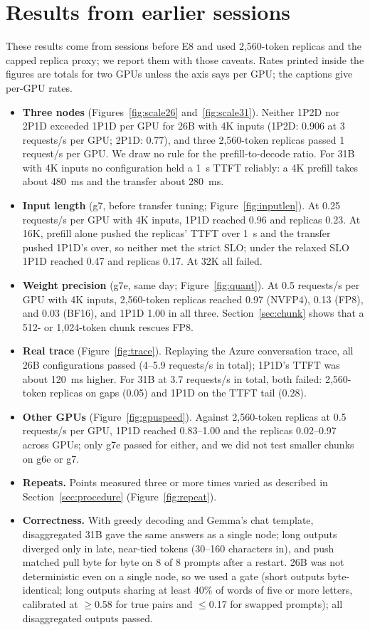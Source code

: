 \documentclass[11pt]{article}
\begin{document}
\section{Results from earlier sessions}\label{app:other}
These results come from sessions before E8 and used 2,560-token replicas and the capped replica proxy; we report them with those caveats. Rates printed inside the figures are totals for two GPUs unless the axis says per GPU; the captions give per-GPU rates.
\begin{itemize}
  \item \textbf{Three nodes} (Figures~\ref{fig:scale26} and~\ref{fig:scale31}). Neither 1P2D nor 2P1D exceeded 1P1D per GPU for 26B with 4K inputs (1P2D: 0.906 at 3 requests/s per GPU; 2P1D: 0.77), and three 2,560-token replicas passed 1 request/s per GPU. We draw no rule for the prefill-to-decode ratio. For 31B with 4K inputs no configuration held a 1~s TTFT reliably: a 4K prefill takes about 480~ms and the transfer about 280~ms.
  \item \textbf{Input length} (g7, before transfer tuning; Figure~\ref{fig:inputlen}). At 0.25 requests/s per GPU with 4K inputs, 1P1D reached 0.96 and replicas 0.23. At 16K, prefill alone pushed the replicas' TTFT over 1~s and the transfer pushed 1P1D's over, so neither met the strict SLO; under the relaxed SLO 1P1D reached 0.47 and replicas 0.17. At 32K all failed.
  \item \textbf{Weight precision} (g7e, same day; Figure~\ref{fig:quant}). At 0.5 requests/s per GPU with 4K inputs, 2,560-token replicas reached 0.97 (NVFP4), 0.13 (FP8), and 0.03 (BF16), and 1P1D 1.00 in all three. Section~\ref{sec:chunk} shows that a 512- or 1,024-token chunk rescues FP8.
  \item \textbf{Real trace} (Figure~\ref{fig:trace}). Replaying the Azure conversation trace, all 26B configurations passed (4--5.9 requests/s in total); 1P1D's TTFT was about 120~ms higher. For 31B at 3.7 requests/s in total, both failed: 2,560-token replicas on gaps (0.05) and 1P1D on the TTFT tail (0.28).
  \item \textbf{Other GPUs} (Figure~\ref{fig:gpuspeed}). Against 2,560-token replicas at 0.5 requests/s per GPU, 1P1D reached 0.83--1.00 and the replicas 0.02--0.97 across GPUs; only g7e passed for either, and we did not test smaller chunks on g6e or g7.
  \item \textbf{Repeats.} Points measured three or more times varied as described in Section~\ref{sec:procedure} (Figure~\ref{fig:repeat}).
  \item \textbf{Correctness.} With greedy decoding and Gemma's chat template, disaggregated 31B gave the same answers as a single node; long outputs diverged only in late, near-tied tokens (30--160 characters in), and push matched pull byte for byte on 8 of 8 prompts after a restart. 26B was not deterministic even on a single node, so we used a gate (short outputs byte-identical; long outputs sharing at least 40\% of words of five or more letters, calibrated at $\ge$0.58 for true pairs and $\le$0.17 for swapped prompts); all disaggregated outputs passed.
\end{itemize}
\end{document}
